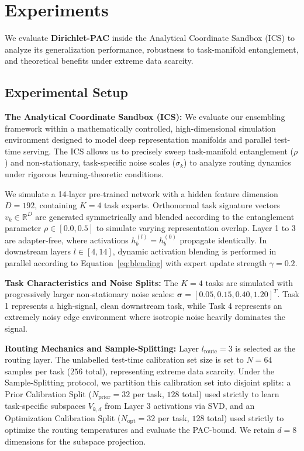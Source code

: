 \section{Experiments}
\label{sec:experiments}

We evaluate \textbf{Dirichlet-PAC} inside the Analytical Coordinate Sandbox (ICS) to analyze its generalization performance, robustness to task-manifold entanglement, and theoretical benefits under extreme data scarcity.

\subsection{Experimental Setup}
\textbf{The Analytical Coordinate Sandbox (ICS):} We evaluate our ensembling framework within a mathematically controlled, high-dimensional simulation environment designed to model deep representation manifolds and parallel test-time serving. The ICS allows us to precisely sweep task-manifold entanglement ($\rho$) and non-stationary, task-specific noise scales ($\sigma_k$) to analyze routing dynamics under rigorous learning-theoretic conditions.

We simulate a 14-layer pre-trained network with a hidden feature dimension $D = 192$, containing $K = 4$ task experts. Orthonormal task signature vectors $v_k \in \mathbb{R}^D$ are generated symmetrically and blended according to the entanglement parameter $\rho \in [0.0, 0.5]$ to simulate varying representation overlap. Layer 1 to 3 are adapter-free, where activations $h_b^{(l)} = h_b^{(0)}$ propagate identically. In downstream layers $l \in [4, 14]$, dynamic activation blending is performed in parallel according to Equation~\eqref{eq:blending} with expert update strength $\gamma = 0.2$.

\textbf{Task Characteristics and Noise Splits:} The $K = 4$ tasks are simulated with progressively larger non-stationary noise scales: $\boldsymbol{\sigma} = [0.05, 0.15, 0.40, 1.20]^T$. Task 1 represents a high-signal, clean downstream task, while Task 4 represents an extremely noisy edge environment where isotropic noise heavily dominates the signal.

\textbf{Routing Mechanics and Sample-Splitting:} Layer $l_{\text{route}} = 3$ is selected as the routing layer. The unlabelled test-time calibration set size is set to $N = 64$ samples per task ($256$ total), representing extreme data scarcity. Under the Sample-Splitting protocol, we partition this calibration set into disjoint splits: a Prior Calibration Split ($N_{\text{prior}} = 32$ per task, $128$ total) used strictly to learn task-specific subspaces $V_{k, d}$ from Layer 3 activations via SVD, and an Optimization Calibration Split ($N_{\text{opt}} = 32$ per task, $128$ total) used strictly to optimize the routing temperatures and evaluate the PAC-bound. We retain $d = 8$ dimensions for the subspace projection.

